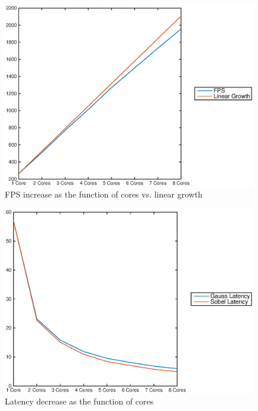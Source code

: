 \begin{figure}[h!]
    \begin{center}
        \includegraphics[width=0.99\textwidth]{images/coremask_fps.eps}
        \caption{FPS increase as the function of cores vs. linear growth}
        \label{fig:fpsvcores}
    \end{center}
\end{figure}

\begin{figure}[h!]
    \begin{center}
        \includegraphics[width=0.99\textwidth]{images/coremask_latencies.eps}
        \caption{Latency decrease as the function of cores}
        \label{fig:latencyvcores}
    \end{center}
\end{figure}
